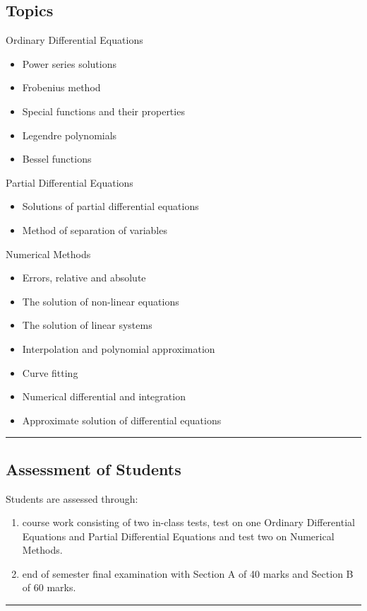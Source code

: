 \subsection*{Topics}
\begin{outline}
    \1 Ordinary Differential Equations
    \begin{itemize}
        \item Power series solutions
        \item Frobenius method
        \item Special functions and their properties
        \item Legendre polynomials
        \item Bessel functions
    \end{itemize}
    \1 Partial Differential Equations
    \begin{itemize}
        \item Solutions of partial differential equations
        \item Method of separation of variables
    \end{itemize}
    \1 Numerical Methods
    \begin{itemize}
        \item Errors, relative and absolute
        \item The solution of non-linear equations
        \item The solution of linear systems
        \item Interpolation and polynomial approximation
        \item Curve fitting
        \item Numerical differential and integration
        \item Approximate solution of differential equations
    \end{itemize}
\end{outline}
\vspace{2ex} \hrule\vspace{2ex}

\subsection*{Assessment of Students}
\begin{outline}
    \1 Students are assessed through:
    \begin{enumerate}
        \item course work consisting of two in-class tests, test on one Ordinary Differential Equations and Partial Differential Equations and test two on Numerical Methods.
        \item end of semester final examination with Section A of 40 marks and Section B of 60 marks.
    \end{enumerate}

\end{outline}
\vspace{2ex}\hrule\vspace{2ex}

